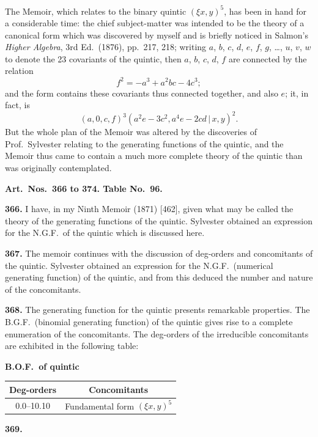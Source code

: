 \documentclass[11pt,a4paper]{book}
\begin{document}
The Memoir, which relates to the binary quintic $(\xi x, y)^5$, has been in hand for a considerable time: the chief subject-matter was intended to be the theory of a canonical form which was discovered by myself and is briefly noticed in Salmon's \textit{Higher Algebra}, 3rd Ed.\ (1876), pp.\ 217, 218; writing $a$, $b$, $c$, $d$, $e$, $f$, $g$, \dots, $u$, $v$, $w$ to denote the 23 covariants of the quintic, then $a$, $b$, $c$, $d$, $f$ are connected by the relation
\[
f^2 = -a^3 + a^2bc - 4c^3;
\]
and the form contains these covariants thus connected together, and also $e$; it, in fact, is
\[
(a, 0, c, f)^3(a^2e - 3c^2, a^4e - 2cd\,|\,x, y)^2.
\]
But the whole plan of the Memoir was altered by the discoveries of Prof.\ Sylvester relating to the generating functions of the quintic, and the Memoir thus came to contain a much more complete theory of the quintic than was originally contemplated.

\medskip
\noindent\textbf{Art.\ Nos.\ 366 to 374. Table No.\ 96.}

\medskip
\noindent\textbf{366.}\quad
I have, in my Ninth Memoir (1871) [462], given what may be called the theory of the generating functions of the quintic. Sylvester obtained an expression for the N.G.F.\ of the quintic which is discussed here.

\medskip
\noindent\textbf{367.}\quad
The memoir continues with the discussion of deg-orders and concomitants of the quintic. Sylvester obtained an expression for the N.G.F.\ (numerical generating function) of the quintic, and from this deduced the number and nature of the concomitants.

\medskip
\noindent\textbf{368.}\quad
The generating function for the quintic presents remarkable properties. The B.G.F.\ (binomial generating function) of the quintic gives rise to a complete enumeration of the concomitants. The deg-orders of the irreducible concomitants are exhibited in the following table:

\begin{center}
\textbf{B.O.F.\ of quintic}
\medskip
\begin{tabular}{|c|l|}
\hline
Deg-orders & \multicolumn{1}{c|}{Concomitants} \\
\hline
0.0--10.10 & Fundamental form $(\xi x, y)^5$ \\
\hline
\end{tabular}
\end{center}

\medskip
\noindent\textbf{369.}
\end{document}
